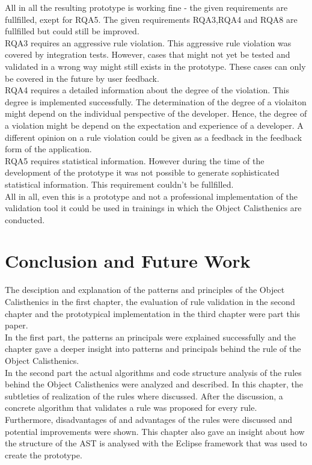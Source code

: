 All in all the resulting prototype is working fine - the given requirements are fullfilled, exept for RQA5. The given requirements RQA3,RQA4 and RQA8 are fullfilled but could still be improved.
\\

RQA3 requires an aggressive rule violation. This aggressive rule violation was covered by integration tests. However, cases that might not yet be tested and validated in a wrong way might still exists in the prototype. These cases can only be covered in the future by user feedback.
\\

RQA4 requires a detailed information about the degree of the violation. This degree is implemented successfully. The determination of the degree of a violaiton might depend on the individual perspective of the developer. Hence, the degree of a violation might be depend on the expectation and experience of a developer. A different opinion on a rule violation could be given as a feedback in the feedback form of the application.
\\

RQA5 requires statistical information. However during the time of the development of the prototype it was not possible to generate sophisticated statistical information. This requirement couldn't be fullfilled. 
\\

All in all, even this is a prototype and not a professional implementation of the validation tool it could be used in trainings in which the Object Calisthenics are conducted. 

\section{Conclusion and Future Work}
\label{p:outlook}
The desciption and explanation of the patterns and principles of the Object Calisthenics in the first chapter, the evaluation of rule validation in the second chapter and the prototypical implementation in the third chapter were part this paper. 
\\

In the first part, the patterns an principals were explained successfully and the chapter gave a deeper insight into patterns and principals behind the rule of the Object Calisthenics. 
\\

In the second part the actual algorithms and code structure analysis of the rules behind the Object Calisthenics were analyzed and described. In this chapter, the subtleties of realization of the rules where discussed. After the discussion, a concrete algorithm that validates a rule was proposed for every rule. Furthermore, disadvantages of and advantages of the rules were discussed and potential improvements were shown. 
This chapter also gave an insight about how the structure of the \acf{AST} is analysed with the Eclipse framework that was used to create the prototype.
\\

